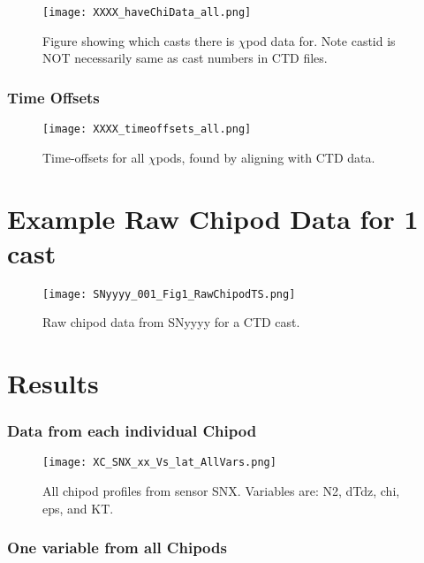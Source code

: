 \documentclass[11pt]{article}
\begin{document}
\begin{figure}[htbp]
\texttt{[image: XXXX\_haveChiData\_all.png]}
\caption{Figure showing which casts there is $\chi$pod data for. Note castid is NOT necessarily same as cast numbers in CTD files.}
\label{ischidata}
\end{figure}


\subsubsection{Time Offsets}


\begin{figure}[htbp]
\texttt{[image: XXXX\_timeoffsets\_all.png]}
\caption{Time-offsets for all $\chi$pods, found by aligning with CTD data.}
\label{toffs}
\end{figure}



\newpage
\section{Example Raw Chipod Data for 1 cast}

\begin{figure}[htbp]
\texttt{[image: SNyyyy\_001\_Fig1\_RawChipodTS.png]}
\caption{Raw chipod data from SNyyyy for a CTD cast.}
\label{snyyyy_1}
\end{figure}



\newpage
\section{Results}


\clearpage
\subsubsection{Data from each individual Chipod}


\begin{figure}[htbp]
\texttt{[image: XC\_SNX\_xx\_Vs\_lat\_AllVars.png]}
\caption{All chipod profiles from sensor SNX. Variables are: N2, dTdz, chi, eps, and KT.}
\label{}
\end{figure}



\clearpage
\newpage
\subsubsection{One variable from all Chipods}
\end{document}
